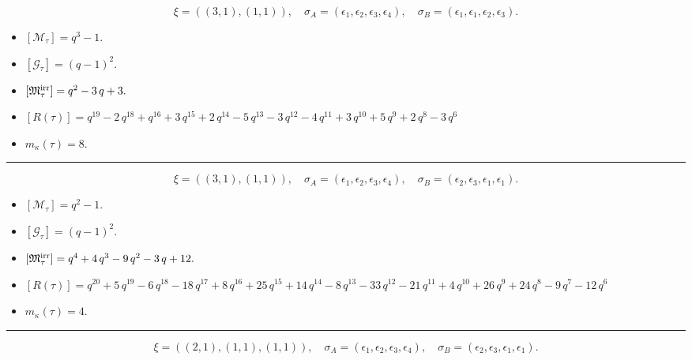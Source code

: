 \documentclass[10pt,a4paper]{amsart}
\begin{document}
$$\xi = ({(3, 1)}, {(1, 1)}),\quad \sigma_A = ({{\epsilon_1, \epsilon_2, \epsilon_3}}, {{\epsilon_4}}),\quad \sigma_B = ({{\epsilon_1, \epsilon_1, \epsilon_2}}, {{\epsilon_3}}).$$

\begin{itemize}
 \item $[\mathcal{M}_{\tau}] = q^{3} - 1 .$

 \item $[\mathcal{G}_{\tau}] = {\left(q - 1\right)}^{2} .$

 \item $[{\frak M}_{\tau}^{\textrm{irr}}] = q^{2} - 3 \, q + 3 .$

 \item $[R(\tau)] = q^{19} - 2 \, q^{18} + q^{16} + 3 \, q^{15} + 2 \, q^{14} - 5 \, q^{13} - 3 \, q^{12} - 4 \, q^{11} + 3 \, q^{10} + 5 \, q^{9} + 2 \, q^{8} - 3 \, q^{6} $

 \item $m_{\kappa}(\tau) = 8 .$

 \end{itemize}
\noindent\rule{8cm}{0.4pt}

$$\xi = ({(3, 1)}, {(1, 1)}),\quad \sigma_A = ({{\epsilon_1, \epsilon_2, \epsilon_3}}, {{\epsilon_4}}),\quad \sigma_B = ({{\epsilon_2, \epsilon_3, \epsilon_1}}, {{\epsilon_1}}).$$

\begin{itemize}
 \item $[\mathcal{M}_{\tau}] = q^{2} - 1 .$

 \item $[\mathcal{G}_{\tau}] = {\left(q - 1\right)}^{2} .$

 \item $[{\frak M}_{\tau}^{\textrm{irr}}] = q^{4} + 4 \, q^{3} - 9 \, q^{2} - 3 \, q + 12 .$

 \item $[R(\tau)] = q^{20} + 5 \, q^{19} - 6 \, q^{18} - 18 \, q^{17} + 8 \, q^{16} + 25 \, q^{15} + 14 \, q^{14} - 8 \, q^{13} - 33 \, q^{12} - 21 \, q^{11} + 4 \, q^{10} + 26 \, q^{9} + 24 \, q^{8} - 9 \, q^{7} - 12 \, q^{6} $

 \item $m_{\kappa}(\tau) = 4 .$

 \end{itemize}
\noindent\rule{8cm}{0.4pt}

$$\xi = ({(2, 1), (1, 1)}, {(1, 1)}),\quad \sigma_A = ({{\epsilon_1, \epsilon_2}, {\epsilon_3}}, {{\epsilon_4}}),\quad \sigma_B = ({{\epsilon_2, \epsilon_3}, {\epsilon_1}}, {{\epsilon_1}}).$$
\end{document}
